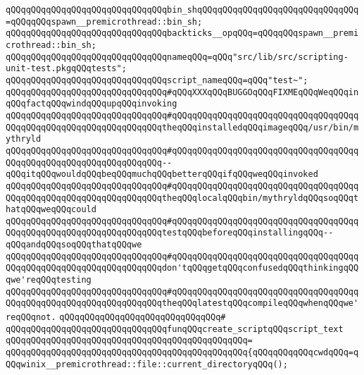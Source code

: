\newline
\verb|qQQqqQQqqQQqqQQqqQQqqQQqqQQqqQQqbin_shqQQqqQQqqQQqqQQqqQQqqQQqqQQqqQQq=qQQqqQQqspawn__premicrothread::bin_sh;|\newline
\verb|qQQqqQQqqQQqqQQqqQQqqQQqqQQqqQQqbackticks__opqQQq=qQQqqQQqspawn__premicrothread::bin_sh;|\newline
\newline
\verb|qQQqqQQqqQQqqQQqqQQqqQQqqQQqqQQqnameqQQq=qQQq"src/lib/src/scripting-unit-test.pkgqQQqtests";|\newline
\newline
\verb|qQQqqQQqqQQqqQQqqQQqqQQqqQQqqQQqscript_nameqQQq=qQQq"test~";|\newline
\newline
\verb|qQQqqQQqqQQqqQQqqQQqqQQqqQQqqQQq#qQQqXXXqQQqBUGGOqQQqFIXMEqQQqWeqQQqinqQQqfactqQQqwindqQQqupqQQqinvoking|\newline
\verb|qQQqqQQqqQQqqQQqqQQqqQQqqQQqqQQq#qQQqqQQqqQQqqQQqqQQqqQQqqQQqqQQqqQQqqQQqqQQqqQQqqQQqqQQqqQQqqQQqqQQqtheqQQqinstalledqQQqimageqQQq/usr/bin/mythryld|\newline
\verb|qQQqqQQqqQQqqQQqqQQqqQQqqQQqqQQq#qQQqqQQqqQQqqQQqqQQqqQQqqQQqqQQqqQQqqQQqqQQqqQQqqQQqqQQqqQQqqQQqqQQq--qQQqitqQQqwouldqQQqbeqQQqmuchqQQqbetterqQQqifqQQqweqQQqinvoked|\newline
\verb|qQQqqQQqqQQqqQQqqQQqqQQqqQQqqQQq#qQQqqQQqqQQqqQQqqQQqqQQqqQQqqQQqqQQqqQQqqQQqqQQqqQQqqQQqqQQqqQQqqQQqtheqQQqlocalqQQqbin/mythryldqQQqsoqQQqthatqQQqweqQQqcould|\newline
\verb|qQQqqQQqqQQqqQQqqQQqqQQqqQQqqQQq#qQQqqQQqqQQqqQQqqQQqqQQqqQQqqQQqqQQqqQQqqQQqqQQqqQQqqQQqqQQqqQQqqQQqtestqQQqbeforeqQQqinstallingqQQq--qQQqandqQQqsoqQQqthatqQQqwe|\newline
\verb|qQQqqQQqqQQqqQQqqQQqqQQqqQQqqQQq#qQQqqQQqqQQqqQQqqQQqqQQqqQQqqQQqqQQqqQQqqQQqqQQqqQQqqQQqqQQqqQQqqQQqdon'tqQQqgetqQQqconfusedqQQqthinkingqQQqwe'reqQQqtesting|\newline
\verb|qQQqqQQqqQQqqQQqqQQqqQQqqQQqqQQq#qQQqqQQqqQQqqQQqqQQqqQQqqQQqqQQqqQQqqQQqqQQqqQQqqQQqqQQqqQQqqQQqqQQqtheqQQqlatestqQQqcompileqQQqwhenqQQqwe'reqQQqnot.|\newline
\verb|qQQqqQQqqQQqqQQqqQQqqQQqqQQqqQQq#|\newline
\verb|qQQqqQQqqQQqqQQqqQQqqQQqqQQqqQQqfunqQQqcreate_scriptqQQqscript_text|\newline
\verb|qQQqqQQqqQQqqQQqqQQqqQQqqQQqqQQqqQQqqQQqqQQqqQQq=|\newline
\verb|qQQqqQQqqQQqqQQqqQQqqQQqqQQqqQQqqQQqqQQqqQQqqQQq{qQQqqQQqqQQqcwdqQQq=qQQqwinix__premicrothread::file::current_directoryqQQq();|\newline
